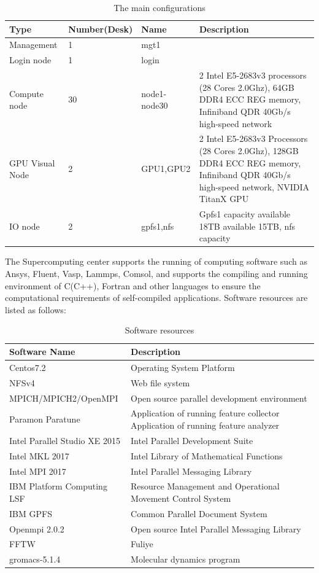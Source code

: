 \documentclass[a4paper,12pt]{article}
\begin{document}
\begin{table}[H]
\centering
\caption{The main configurations}
\begin{tabular}{|l|l|l|p{6cm}|}
\hline
Type & Number(Desk) & Name & Description \\
\hline
Management & 1 & mgt1 &  \\
\hline
Login node & 1 & login &  \\
\hline
Compute node & 30 & node1-node30 & 2 Intel E5-2683v3 processors (28 Cores 2.0Ghz), 64GB DDR4 ECC REG memory, Infiniband QDR 40Gb/s high-speed network \\
\hline
GPU Visual Node & 2 & GPU1,GPU2 & 2 Intel E5-2683v3 Processors (28 Cores 2.0Ghz), 128GB DDR4 ECC REG memory, Infiniband QDR 40Gb/s high-speed network, NVIDIA TitanX GPU \\
\hline
IO node & 2 & gpfs1,nfs & Gpfs1 capacity available 18TB available 15TB, nfs capacity \\
\hline
\end{tabular}
\end{table}

The Supercomputing center supports the running of computing software such as Ansys, Fluent, Vasp, Lammps, Comsol, and supports the compiling and running environment of C(C++), Fortran and other languages to ensure the computational requirements of self-compiled applications. Software resources are listed as follows:

\begin{table}[H]
\centering
\caption{Software resources}
\begin{tabular}{|l|p{8cm}|}
\hline
Software Name & Description \\
\hline
Centos7.2 & Operating System Platform \\
\hline
NFSv4 & Web file system \\
\hline
MPICH/MPICH2/OpenMPI & Open source parallel development environment \\
\hline
Paramon Paratune & Application of running feature collector Application of running feature analyzer \\
\hline
Intel Parallel Studio XE 2015 & Intel Parallel Development Suite \\
\hline
Intel MKL 2017 & Intel Library of Mathematical Functions \\
\hline
Intel MPI 2017 & Intel Parallel Messaging Library \\
\hline
IBM Platform Computing LSF & Resource Management and Operational Movement Control System \\
\hline
IBM GPFS & Common Parallel Document System \\
\hline
Openmpi 2.0.2 & Open source Intel Parallel Messaging Library \\
\hline
FFTW & Fuliye \\
\hline
gromacs-5.1.4 & Molecular dynamics program \\
\hline
\end{tabular}
\end{table}
\end{document}
